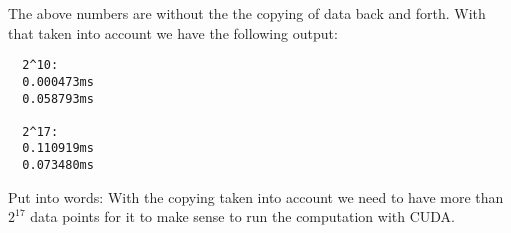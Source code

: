 \documentclass[a4paper,12pt]{article}
\begin{document}
The above numbers are without the the copying of data back and forth. With that taken into account we have the following output:

\begin{lstlisting}
  2^10:
  0.000473ms
  0.058793ms

  2^17:
  0.110919ms
  0.073480ms
\end{lstlisting}

Put into words: With the copying taken into account we need to have more than $2^{17}$ data points for it to make sense to run the computation with CUDA.
\end{document}
